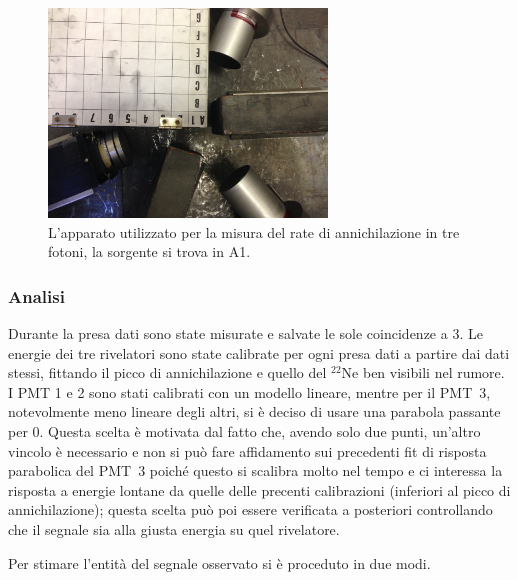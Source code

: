 
 \begin{figure}[h]
	\centering
	\includegraphics[width=20em]{immagini/3gamma_foto}
	\caption{\label{fig:3gamma_signal} L'apparato utilizzato per la misura del rate di annichilazione in tre fotoni, la sorgente si trova in A1.}
	\label{fig:foto_3gamma}
\end{figure}

\subsubsection{Analisi}

Durante la presa dati sono state misurate e salvate le sole coincidenze a 3. Le energie dei tre rivelatori sono state calibrate per ogni presa dati a partire dai dati stessi, fittando il picco di annichilazione e quello del $^{22}\text{Ne}$ ben visibili nel rumore. I PMT 1 e 2 sono stati calibrati con un modello lineare, mentre per il PMT~3, notevolmente meno lineare degli altri, si è deciso di usare una parabola passante per 0. Questa scelta è motivata dal fatto che, avendo solo due punti, un'altro vincolo è necessario e non si può fare affidamento sui precedenti fit di risposta parabolica del PMT~3 poiché questo si scalibra molto nel tempo e ci interessa la risposta a energie lontane da quelle delle precenti calibrazioni (inferiori al picco di annichilazione); questa scelta può poi essere verificata a posteriori controllando che il segnale sia alla giusta energia su quel rivelatore.

Per stimare l'entità del segnale osservato si è proceduto in due modi.

